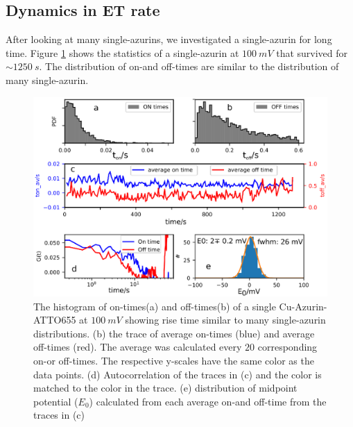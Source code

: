 \documentclass[journal=jacsat,manuscript=article]{achemso}
\begin{document}
\subsection{Dynamics in ET rate}
After looking at many single-azurins, we investigated a single-azurin for long time. Figure \ref{fig:long_azurin_trace} shows the statistics of a single-azurin at $100~mV$ that survived for ${\sim}1250~s$. The distribution of on-and off-times are similar to the distribution of many single-azurin.
\begin{figure}
	\centering
	\includegraphics[width=\textwidth]{long_azurin_trace.eps}
	\caption{The histogram of on-times(a) and off-times(b) of a single Cu-Azurin-ATTO655 at $100~mV$ showing rise time similar to many single-azurin distributions. (b) the trace of average on-times (blue) and average off-times (red). The average was calculated every $20$ corresponding on-or off-times. The respective y-scales have the same color as the data points. (d) Autocorrelation of the traces in (c) and the color is matched to the color in the trace. (e) distribution of midpoint potential ($E_0$) calculated from each average on-and off-time from the traces in (c)}
	\label{fig:long_azurin_trace}
\end{figure}
\end{document}
